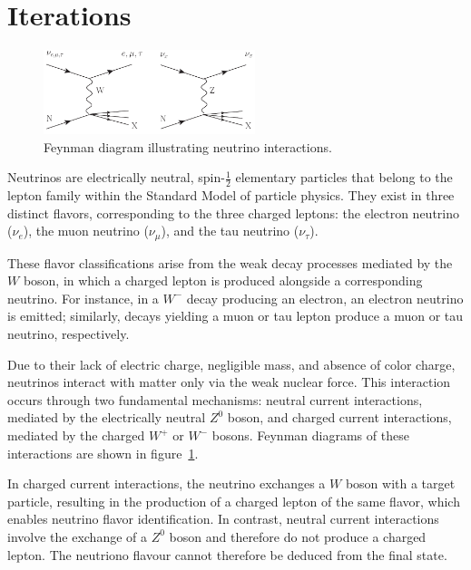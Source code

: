 \documentclass{pracalicmgr}
\begin{document}
\section{Iterations}

\begin{figure}[h]
    \centering
    \includegraphics[width=0.55\textwidth]{src/xfig1_3nu.pdf}
    \caption{Feynman diagram illustrating neutrino interactions.\cite{neutrinoFeynmann}}
    \label{fig:Feynman_diagram_neutrino}
\end{figure}

Neutrinos are electrically neutral, spin-$\frac{1}{2}$ elementary particles that belong to the lepton family within the Standard Model of particle physics. They exist in three distinct flavors, corresponding to the three charged leptons: the electron neutrino ($\nu_e$), the muon neutrino ($\nu_\mu$), and the tau neutrino ($\nu_\tau$).\cite{neutrinoFeynmann}

These flavor classifications arise from the weak decay processes mediated by the $W$ boson, in which a charged lepton is produced alongside a corresponding neutrino. For instance, in a $W^-$ decay producing an electron, an electron neutrino is emitted; similarly, decays yielding a muon or tau lepton produce a muon or tau neutrino, respectively.

Due to their lack of electric charge, negligible mass, and absence of color charge, neutrinos interact with matter only via the weak nuclear force. This interaction occurs through two fundamental mechanisms: neutral current interactions, mediated by the electrically neutral $Z^0$ boson, and charged current interactions, mediated by the charged $W^+$ or $W^-$ bosons. Feynman diagrams of these interactions are shown in figure~\ref{fig:Feynman_diagram_neutrino}.

In charged current interactions, the neutrino exchanges a $W$ boson with a target particle, resulting in the production of a charged lepton of the same flavor, which enables neutrino flavor identification. In contrast, neutral current interactions involve the exchange of a $Z^0$ boson and therefore do not produce a charged lepton. The neutriono flavour cannot therefore be deduced from the final state.
\end{document}
